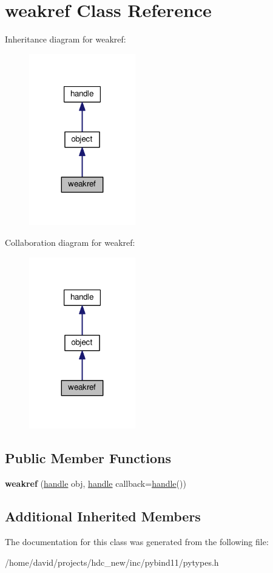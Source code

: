 \hypertarget{classweakref}{}\section{weakref Class Reference}
\label{classweakref}


Inheritance diagram for weakref\+:
\nopagebreak
\begin{figure}[H]
\begin{center}
\leavevmode
\includegraphics[width=131pt]{classweakref__inherit__graph}
\end{center}
\end{figure}


Collaboration diagram for weakref\+:
\nopagebreak
\begin{figure}[H]
\begin{center}
\leavevmode
\includegraphics[width=131pt]{classweakref__coll__graph}
\end{center}
\end{figure}
\subsection*{Public Member Functions}
\begin{DoxyCompactItemize}
\item 
{\bfseries weakref} (\hyperlink{classhandle}{handle} obj, \hyperlink{classhandle}{handle} callback=\hyperlink{classhandle}{handle}())\hypertarget{classweakref_a0fd28d092bb5335f0cfd219714a41abb}{}\label{classweakref_a0fd28d092bb5335f0cfd219714a41abb}

\end{DoxyCompactItemize}
\subsection*{Additional Inherited Members}


The documentation for this class was generated from the following file\+:\begin{DoxyCompactItemize}
\item 
/home/david/projects/hdc\+\_\+new/inc/pybind11/pytypes.\+h\end{DoxyCompactItemize}

